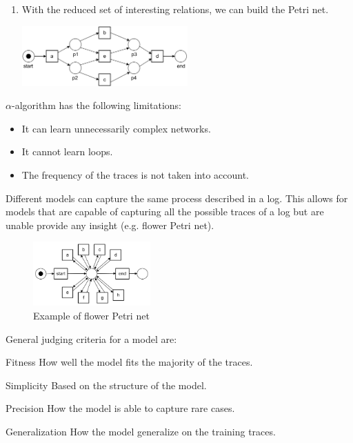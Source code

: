 \begin{description}
\begin{example}
\begin{enumerate}
                \item With the reduced set of interesting relations, we can build the Petri net.
                    \begin{center}
                        \includegraphics[width=0.5\textwidth]{img/alpha_algorithm_example.png}
                    \end{center}
            \end{enumerate}
        \end{example}

        $\alpha$-algorithm has the following limitations:
        \begin{itemize}
            \item It can learn unnecessarily complex networks.
            \item It cannot learn loops.
            \item The frequency of the traces is not taken into account.
        \end{itemize}


    \item[Model evaluation]
        Different models can capture the same process described in a log.
        This allows for models that are capable of capturing all the possible traces of a log but 
        are unable provide any insight (e.g. flower Petri net).

        \begin{figure}[H]
            \centering
            \includegraphics[width=0.4\textwidth]{img/flower_petri.png}
            \caption{Example of flower Petri net}
        \end{figure}

        General judging criteria for a model are:
        \begin{descriptionlist}
            \item[Fitness] 
                How well the model fits the majority of the traces.
            \item[Simplicity] 
                Based on the structure of the model.
            \item[Precision] 
                How the model is able to capture rare cases.
            \item[Generalization] 
                How the model generalize on the training traces.
        \end{descriptionlist}
\end{description}



